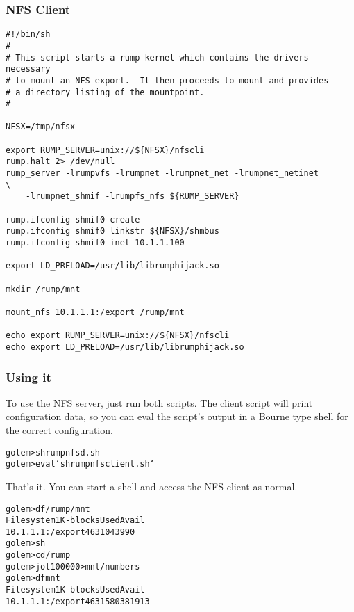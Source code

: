 \subsubsection{NFS Client}

{\footnotesize
\begin{verbatim}
#!/bin/sh
#
# This script starts a rump kernel which contains the drivers necessary
# to mount an NFS export.  It then proceeds to mount and provides
# a directory listing of the mountpoint.
#

NFSX=/tmp/nfsx

export RUMP_SERVER=unix://${NFSX}/nfscli
rump.halt 2> /dev/null
rump_server -lrumpvfs -lrumpnet -lrumpnet_net -lrumpnet_netinet        \
    -lrumpnet_shmif -lrumpfs_nfs ${RUMP_SERVER}

rump.ifconfig shmif0 create
rump.ifconfig shmif0 linkstr ${NFSX}/shmbus
rump.ifconfig shmif0 inet 10.1.1.100

export LD_PRELOAD=/usr/lib/librumphijack.so

mkdir /rump/mnt

mount_nfs 10.1.1.1:/export /rump/mnt

echo export RUMP_SERVER=unix://${NFSX}/nfscli
echo export LD_PRELOAD=/usr/lib/librumphijack.so
\end{verbatim}}

\subsubsection{Using it}

To use the NFS server, just run both scripts.  The client script
will print configuration data, so you can eval the script's output in a
Bourne type shell for the correct configuration.

{\footnotesize
\begin{alltt}
golem> sh rumpnfsd.sh
golem> eval `sh rumpnfsclient.sh`
\end{alltt}}

That's it.  You can start a shell and access the NFS client as
normal.

{\footnotesize
\begin{alltt}
golem> df /rump/mnt
Filesystem       1K-blocks       Used      Avail %Cap Mounted on
10.1.1.1:/export       4631          0       4399   0% /mnt
golem> sh
golem> cd /rump
golem> jot 100000 > mnt/numbers
golem> df mnt
Filesystem       1K-blocks       Used      Avail %Cap Mounted on
10.1.1.1:/export       4631        580       3819  13% /mnt
\end{alltt}}

